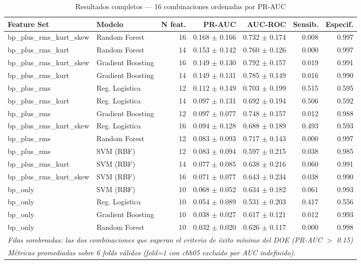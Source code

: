 \documentclass[12pt,a4paper]{article}
\begin{document}
\begin{table}[H]
\centering
\caption{Resultados completos — 16 combinaciones ordenadas por PR-AUC}
\label{tab:resultados_completos}
\renewcommand{\arraystretch}{1.25}
\small
\begin{tabular}{llrrrrr}
\toprule
\textbf{Feature Set} & \textbf{Modelo} &
\textbf{N feat.} & \textbf{PR-AUC} & \textbf{AUC-ROC} &
\textbf{Sensib.} & \textbf{Especif.} \\
\midrule
\rowcolor{green!12}
bp\_plus\_rms\_kurt\_skew & Random Forest     & 16 & 0.168 $\pm$ 0.166 & 0.732 $\pm$ 0.174 & 0.008 & 0.997 \\
\rowcolor{green!12}
bp\_plus\_rms\_kurt       & Random Forest     & 14 & 0.153 $\pm$ 0.142 & 0.760 $\pm$ 0.126 & 0.000 & 0.997 \\
bp\_plus\_rms\_kurt\_skew & Gradient Boosting & 16 & 0.149 $\pm$ 0.130 & 0.792 $\pm$ 0.157 & 0.019 & 0.991 \\
bp\_plus\_rms\_kurt       & Gradient Boosting & 14 & 0.149 $\pm$ 0.131 & 0.785 $\pm$ 0.149 & 0.016 & 0.990 \\
bp\_plus\_rms             & Reg. Logística    & 12 & 0.112 $\pm$ 0.149 & 0.703 $\pm$ 0.199 & 0.515 & 0.595 \\
bp\_plus\_rms\_kurt       & Reg. Logística    & 14 & 0.097 $\pm$ 0.131 & 0.692 $\pm$ 0.194 & 0.506 & 0.592 \\
bp\_plus\_rms             & Gradient Boosting & 12 & 0.097 $\pm$ 0.077 & 0.748 $\pm$ 0.157 & 0.012 & 0.988 \\
bp\_plus\_rms\_kurt\_skew & Reg. Logística    & 16 & 0.094 $\pm$ 0.128 & 0.688 $\pm$ 0.189 & 0.493 & 0.593 \\
bp\_plus\_rms             & Random Forest     & 12 & 0.083 $\pm$ 0.093 & 0.717 $\pm$ 0.143 & 0.000 & 0.997 \\
bp\_plus\_rms             & SVM (RBF)         & 12 & 0.083 $\pm$ 0.094 & 0.597 $\pm$ 0.215 & 0.038 & 0.985 \\
bp\_plus\_rms\_kurt       & SVM (RBF)         & 14 & 0.077 $\pm$ 0.085 & 0.638 $\pm$ 0.216 & 0.060 & 0.991 \\
bp\_plus\_rms\_kurt\_skew & SVM (RBF)         & 16 & 0.071 $\pm$ 0.077 & 0.643 $\pm$ 0.234 & 0.038 & 0.990 \\
bp\_only                  & SVM (RBF)         & 10 & 0.068 $\pm$ 0.052 & 0.634 $\pm$ 0.182 & 0.061 & 0.993 \\
bp\_only                  & Reg. Logística    & 10 & 0.054 $\pm$ 0.089 & 0.531 $\pm$ 0.203 & 0.417 & 0.556 \\
bp\_only                  & Gradient Boosting & 10 & 0.038 $\pm$ 0.027 & 0.617 $\pm$ 0.121 & 0.012 & 0.993 \\
bp\_only                  & Random Forest     & 10 & 0.032 $\pm$ 0.020 & 0.626 $\pm$ 0.117 & 0.000 & 0.998 \\
\bottomrule
\multicolumn{7}{l}{\small \textit{Filas sombreadas: las dos combinaciones que superan el criterio de éxito mínimo del DOE (PR-AUC $>$ 0.15)}} \\
\multicolumn{7}{l}{\small \textit{Métricas promediadas sobre 6 folds válidos (fold=1 con chb05 excluido por AUC indefinido).}}
\end{tabular}
\end{table}
\end{document}
